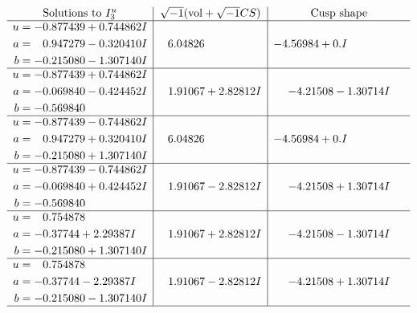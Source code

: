 \documentclass[1p]{elsarticle_modified}
\theoremstyle{definition}
\newcommand{\I}{\sqrt{-1}}
\begin{document}
$$\begin{array}{c|c|c}  
\text{Solutions to }I^u_{3}& \I (\text{vol} + \sqrt{-1}CS) & \text{Cusp shape}\\
 \hline 
\begin{aligned}
u &= -0.877439 + 0.744862 I \\
a &= \phantom{-}0.947279 - 0.320410 I \\
b &= -0.215080 - 1.307140 I\end{aligned}
 & \phantom{-}6.04826\phantom{ +0.000000I} & -4.56984 + 0. I\phantom{ +0.000000I} \\ \hline\begin{aligned}
u &= -0.877439 + 0.744862 I \\
a &= -0.069840 - 0.424452 I \\
b &= -0.569840\phantom{ +0.000000I}\end{aligned}
 & \phantom{-}1.91067 + 2.82812 I & -4.21508 - 1.30714 I \\ \hline\begin{aligned}
u &= -0.877439 - 0.744862 I \\
a &= \phantom{-}0.947279 + 0.320410 I \\
b &= -0.215080 + 1.307140 I\end{aligned}
 & \phantom{-}6.04826\phantom{ +0.000000I} & -4.56984 + 0. I\phantom{ +0.000000I} \\ \hline\begin{aligned}
u &= -0.877439 - 0.744862 I \\
a &= -0.069840 + 0.424452 I \\
b &= -0.569840\phantom{ +0.000000I}\end{aligned}
 & \phantom{-}1.91067 - 2.82812 I & -4.21508 + 1.30714 I \\ \hline\begin{aligned}
u &= \phantom{-}0.754878\phantom{ +0.000000I} \\
a &= -0.37744 + 2.29387 I \\
b &= -0.215080 + 1.307140 I\end{aligned}
 & \phantom{-}1.91067 + 2.82812 I & -4.21508 - 1.30714 I \\ \hline\begin{aligned}
u &= \phantom{-}0.754878\phantom{ +0.000000I} \\
a &= -0.37744 - 2.29387 I \\
b &= -0.215080 - 1.307140 I\end{aligned}
 & \phantom{-}1.91067 - 2.82812 I & -4.21508 + 1.30714 I\\
 \hline 
 \end{array}$$\newpage\newpage\renewcommand{\arraystretch}{1}
\end{document}
